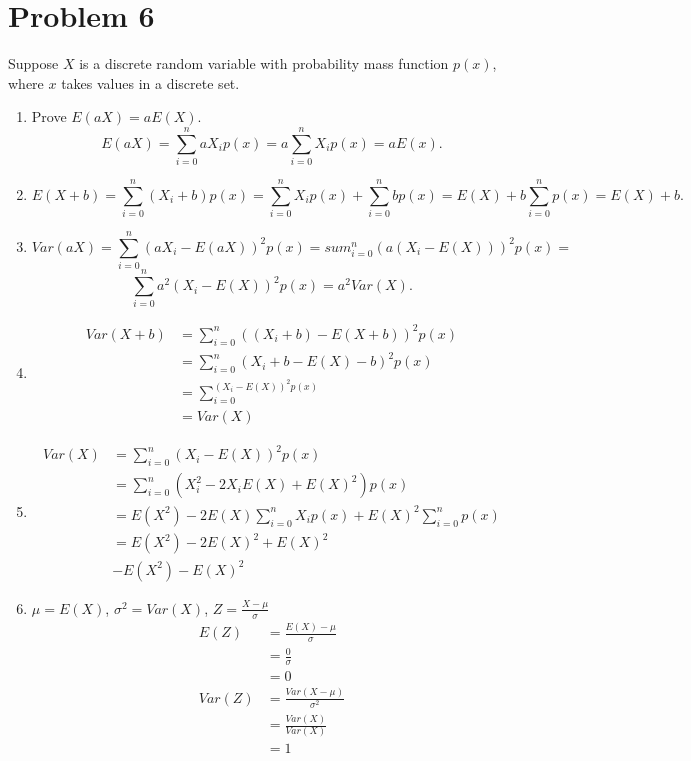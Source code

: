 \documentclass{article}
\begin{document}
\section{Problem 6}
Suppose $X$ is a discrete random variable with probability mass function $p(x)$, where
$x$ takes values in a discrete set.
\begin{enumerate}
    \item Prove $E(aX) = aE(X)$.
        \[
        E(aX) = \sum_{i=0}^{n} aX_ip(x) = a\sum_{i=0}^{n}X_ip(x) = aE(x)
        .\] 
   \item 
       \[
       E(X+b) = \sum_{i=0}^{n}(X_i+b)p(x) = \sum_{i=0}^{n}X_ip(x) + \sum_{i=0}^{n}bp(x) = E(X) + b\sum_{i=0}^{n}p(x) = E(X)+ b
       .\] 
   \item 
       \[
       Var(aX) = \sum_{i=0}^{n}(aX_i-E(aX))^2p(x) = sum_{i=0}^{n}(a(X_i-E(X)))^2p(x) = \] \[ \sum_{i=0}^{n}a^2(X_i-E(X))^2p(x) = a^2Var(X)
       .\] 
   \item
       \begin{align*}
           Var(X + b) &= \sum_{i=0}^{n}((X_i+b) - E(X+b))^2p(x) \\
                      &= \sum_{i=0}^{n}(X_i + b - E(X) - b)^2p(x) \\
                      &= \sum_{i=0}^{(X_i-E(X))^2p(x)} \\
                      &= Var(X)
       \end{align*}
   \item
       \begin{align*}
           Var(X) &= \sum_{i=0}^{n}(X_i - E(X))^2p(x) \\
                  &= \sum_{i=0}^{n}(X_i^2-2X_iE(X)+E(X)^2)p(x) \\
                  &= E(X^2) -2E(X)\sum_{i=0}^{n}X_ip(x) + E(X)^2\sum_{i=0}^{n}p(x) \\
                  &= E(X^2) -2E(X)^2 + E(X)^2 \\
                  &- E(X^2)-E(X)^2
       \end{align*}
   \item
      $\mu = E(X)$, $\sigma^2 = Var(X)$, $Z = \frac{X-\mu}{\sigma}$ 
      \begin{align*}
          E(Z) &= \frac{E(X) - \mu}{\sigma} \\
               &= \frac{0}{\sigma} \\
               &= 0 \\
          Var(Z) &= \frac{Var(X-\mu)}{\sigma^2} \\
                 &= \frac{Var(X)}{Var(X)} \\
                 &= 1
      \end{align*}
\end{enumerate}
\end{document}
